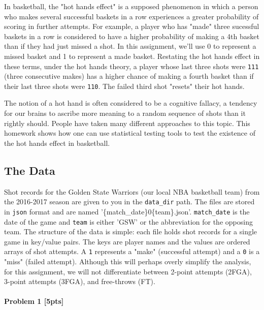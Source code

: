 \documentclass[11pt]{article}
\begin{document}
In basketball, the "hot hands effect" is a supposed phenomenon in which
a person who makes several successful baskets in a row experiences a
greater probability of scoring in further attempts. For example, a
player who has "made" three sucessful baskets in a row is considered to
have a higher probability of making a 4th basket than if they had just
missed a shot. In this assignment, we'll use 0 to represent a missed
basket and 1 to represent a made basket. Restating the hot hands effect
in these terms, under the hot hands theory, a player whose last three
shots were \texttt{\textquotesingle{}111\textquotesingle{}} (three
consecutive makes) has a higher chance of making a fourth basket than if
their last three shots were
\texttt{\textquotesingle{}110\textquotesingle{}}. The failed third shot
"resets" their hot hands.

The notion of a hot hand is often considered to be a cognitive fallacy,
a tendency for our brains to ascribe more meaning to a random sequence
of shots than it rightly should. People have taken many different
approaches to this topic. This homework shows how one can use
statistical testing tools to test the existence of the hot hands effect
in basketball.

\subsection{The Data}\label{the-data}

Shot records for the Golden State Warriors (our local NBA basketball
team) from the 2016-2017 season are given to you in the
\texttt{data\_dir} path. The files are stored in \texttt{json} format
and are named '\{match\_date\}0\{team\}.json'. \texttt{match\_date} is
the date of the game and \texttt{team} is either 'GSW' or the
abbreviation for the opposing team. The structure of the data is simple:
each file holds shot records for a single game in key/value pairs. The
keys are player names and the values are ordered arrays of shot
attempts. A \texttt{1} represents a "make" (successful attempt) and a
\texttt{0} is a "miss" (failed attempt). Although this will perhaps
overly simplify the analysis, for this assignment, we will not
differentiate between 2-point attempts (2FGA), 3-point attempts (3FGA),
and free-throws (FT).

    \paragraph{Problem 1 {[}5pts{]}}\label{problem-1-5pts}
\end{document}
